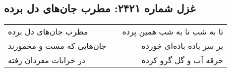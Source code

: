 \begin{center}
\section*{غزل شماره ۲۴۲۱: مطرب جان‌های دل برده}
\label{sec:2421}
\begin{longtable}{l p{0.5cm} r}
مطرب جان‌های دل برده
&&
تا به شب تا به شب همین پرده
\\
جان‌هایی که مست و مخمورند
&&
بر سر باده باده‌ای خورده
\\
در خرابات مفردان رفته
&&
خرقه آب و گل گرو کرده
\\
\end{longtable}
\end{center}

